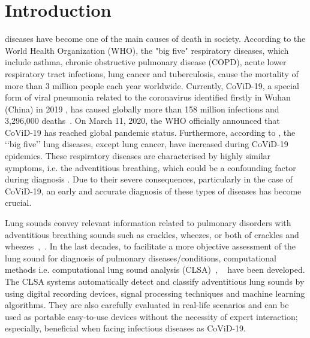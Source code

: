 \documentclass[journal]{IEEEtran}
\begin{document}
\IEEEpeerreviewmaketitle



\section{Introduction}
 diseases have become one of the main causes of death in  society.  According to the World Health Organization (WHO), the "big five"
respiratory diseases, which include asthma, chronic obstructive pulmonary disease (COPD), acute lower respiratory tract infections, lung cancer and tuberculosis, cause the mortality of more than 3 million people each year worldwide. Currently, CoViD-19, a special form of viral pneumonia related to the coronavirus identified firstly in Wuhan (China) in 2019 \cite{chen2020epidemiological}, has caused globally more than 158 million infections and 3,296,000 deaths~\cite{whocovid19}. On March 11, 2020, the WHO officially announced that CoViD-19 has reached global pandemic status.  Furthermore, according to \cite{barbosa2021big}, the ‘‘big five’’ lung diseases, except lung cancer, have increased during CoViD-19 epidemics. These respiratory diseases are characterised by highly similar symptoms, i.e. the adventitious breathing, which could be a confounding factor during diagnosis \cite{chen2020epidemiological}. Due to their severe consequences, particularly in the case of CoViD-19, an early and accurate diagnosis of these types of diseases has become crucial. 

Lung sounds convey relevant information related to pulmonary disorders with adventitious breathing sounds such as crackles, wheezes, or both of crackles and wheezes~\cite{sarkar2015auscultation},~\cite{rocha2018alpha}. In the last decades, to facilitate a more objective assessment of the lung sound for diagnosis of pulmonary diseases/conditions,  computational methods i.e. computational lung sound analysis (CLSA)~\cite{gurung2011computerized},
~\cite{pramono2017automatic} have been developed. The CLSA systems automatically detect and classify adventitious lung sounds by using digital recording devices, signal processing techniques and machine learning algorithms. They are also carefully evaluated in real-life scenarios and can be used as portable easy-to-use devices without the necessity of expert interaction; especially, beneficial when facing infectious diseases as CoViD-19. 
\end{document}
